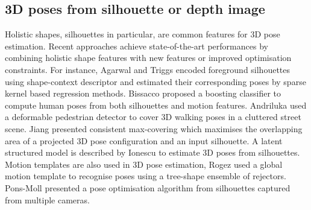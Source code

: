 \subsection{3D poses from silhouette or depth image} 
Holistic shapes, silhouettes in particular, are common features for 3D pose estimation. 
Recent approaches achieve state-of-the-art performances by combining holistic shape features with new features or improved optimisation constraints. 
For instance, Agarwal and Triggs encoded foreground silhouettes using shape-context descriptor and estimated their corresponding poses by sparse kernel based regression methods.   
Bissacco \etal \cite{Bissacco2007} proposed a boosting classifier to compute human poses from both silhouettes and motion features.  
Andriluka \etal used a deformable pedestrian detector to cover 3D walking poses in a cluttered street scene.  
Jiang \etal \cite{Jiang2011} presented consistent max-covering which maximises the overlapping area of a projected 3D pose configuration and an input silhouette. 
A latent structured model is described by Ionescu \etal \cite{Ionescu2011} to estimate 3D poses from silhouettes. 
Motion templates are also used in 3D pose estimation, Rogez \etal \cite{Rogez2012} used a global motion template to recognise poses using a tree-shape ensemble of rejectors. 
Pons-Moll \etal \cite{Pons-Moll2011} presented a pose optimisation algorithm from silhouettes captured from multiple cameras. 

